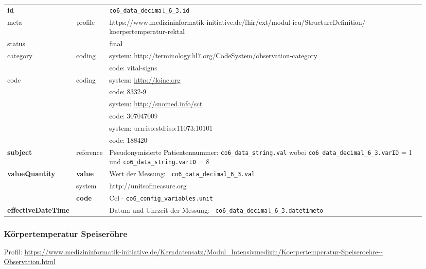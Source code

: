\begin{longtable}{|l|l|p{7.5cm}|}
	\hline
	\rowcolor{lightgray} \multicolumn{3}{|l|}{Data Mapping (inhaltlich)} \\ \hline
	\textbf{id} &  & \texttt{co6\_data\_decimal\_6\_3.id} \\ \hline
	meta & profile & https://www.medizininformatik-initiative.de/fhir/ext/modul-icu/StructureDefinition/ koerpertemperatur-rektal \\ \hline 
	status &  & final   \\ \hline 
	category & coding & system: \url{http://terminology.hl7.org/CodeSystem/observation-category} \\
	\cline{3-3}
	& & code: vital-signs \\ \hline
	code & coding & system: \url{http://loinc.org} \\ 
	\cline{3-3} 
	&  & code: 8332-9 \\ 
	\cline{3-3} 
	&  & system: \url{http://snomed.info/sct} \\ 
	\cline{3-3}
	&  & code: 307047009 \\ 
	\cline{3-3} 
	&  & system: urn:iso:std:iso:11073:10101\\ 
	\cline{3-3}
	&  & code: 188420 \\ \hline
	\textbf{subject} & reference & Pseudonymisierte Patientennummer: \texttt{co6\_data\_string.val} wobei \texttt{co6\_data\_decimal\_6\_3.varID} = 1 und \texttt{co6\_data\_string.varID} = 8 \\ \hline
	\textbf{valueQuantity}  & \textbf{value} & Wert der Messung: \texttt{
		co6\_data\_decimal\_6\_3.val} \\
	\cline{2-3}
	& system & http://unitsofmeasure.org \\
	\cline{2-3}
	& \textbf{code} & Cel - \texttt{co6\_config\_variables.unit} \\ \hline
	\textbf{effectiveDateTime}  & & Datum und Uhrzeit der Messung: \texttt{
		co6\_data\_decimal\_6\_3.datetimeto} \\ \hline
\end{longtable}


\subsubsection{Körpertemperatur Speiseröhre} 
Profil: \url{https://www.medizininformatik-initiative.de/Kerndatensatz/Modul_Intensivmedizin/Koerpertemperatur-Speiseroehre--Observation.html}

